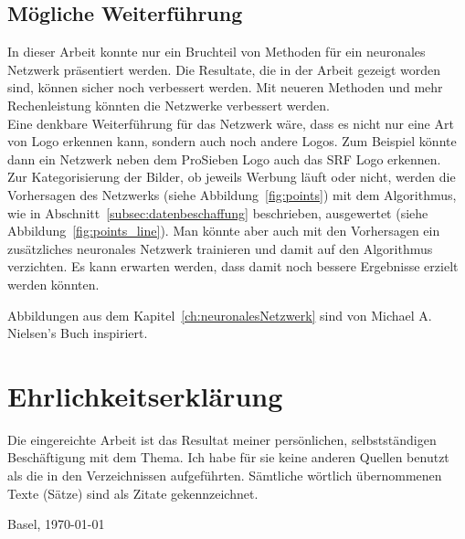 \documentclass[12pt,a4paper]{report}
\begin{document}
\section{Mögliche Weiterführung}
In dieser Arbeit konnte nur ein Bruchteil von Methoden für ein neuronales Netzwerk präsentiert werden.
Die Resultate, die in der Arbeit gezeigt worden sind, können sicher noch verbessert werden.
Mit neueren Methoden und mehr Rechenleistung könnten die Netzwerke verbessert werden.\bigskip\\
Eine denkbare Weiterführung für das Netzwerk wäre, dass es nicht nur eine Art von Logo erkennen kann, sondern auch noch andere Logos.
Zum Beispiel könnte dann ein Netzwerk neben dem ProSieben Logo auch das SRF Logo erkennen.\bigskip\\
Zur Kategorisierung der Bilder, ob jeweils Werbung läuft oder nicht, werden die Vorhersagen des Netzwerks (siehe Abbildung~\ref{fig:points}) mit
dem Algorithmus, wie in Abschnitt~\ref{subsec:datenbeschaffung} beschrieben, ausgewertet (siehe Abbildung~\ref{fig:points_line}).
Man könnte aber auch mit den Vorhersagen ein zusätzliches neuronales Netzwerk trainieren und damit auf den Algorithmus verzichten.
Es kann erwarten werden, dass damit noch bessere Ergebnisse erzielt werden könnten.

\clearpage
{}
{}



\clearpage
{}
{}
\listoffigures
Abbildungen aus dem Kapitel~\ref{ch:neuronalesNetzwerk} sind von Michael A. Nielsen's Buch\cite{neuralbook} inspiriert.

\appendix


\chapter*{Ehrlichkeitserklärung}

Die eingereichte Arbeit ist das Resultat meiner persönlichen, selbstständigen Beschäftigung mit dem Thema.
Ich habe für sie keine anderen Quellen benutzt als die in den Verzeichnissen aufgeführten.
Sämtliche wörtlich übernommenen Texte (Sätze) sind als Zitate gekennzeichnet.

\vspace{2cm}
Basel, \today
\end{document}

